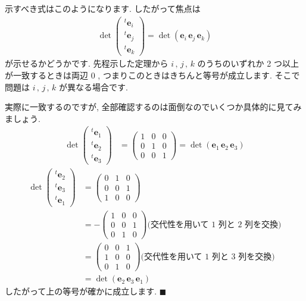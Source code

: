\documentclass[openany, a4paper, oneside]{book}
\theoremstyle{break}
\theoremstyle{breakdefn}
\begin{document}
示すべき式はこのようになります. したがって焦点は
    \begin{align}
        \det \begin{pmatrix} ^{t}\bm{e}_{i} \\ ^{t}\bm{e}_{j} \\ ^{t}\bm{e}_{k} \end{pmatrix}
        =
        \det \left ( \bm{e}_{i} \, \bm{e}_{j} \, \bm{e}_{k} \right)
    \end{align}
が示せるかどうかです. 先程示した定理から $i\, , \,j \, , \, k$ のうちのいずれか 2 つ以上が一致するときは両辺 $0$ ,
つまりこのときはきちんと等号が成立します.
そこで問題は $i\, , \,j \, , \, k$ が異なる場合です.

実際に一致するのですが, 全部確認するのは面倒なのでいくつか具体的に見てみましょう.
    \begin{align}
        \det \begin{pmatrix} ^{t}\bm{e}_{1} \\ ^{t}\bm{e}_{2} \\ ^{t}\bm{e}_{3} \end{pmatrix}
        &= \begin{pmatrix} 1 & 0 & 0 \\
                          0 & 1 & 0 \\
                          0 & 0 & 1
          \end{pmatrix}
        =
        \det \left ( \bm{e}_{1} \, \bm{e}_{2} \, \bm{e}_{3} \right)
    \end{align}
    \begin{align}
        \det \begin{pmatrix} ^{t}\bm{e}_{2} \\ ^{t}\bm{e}_{3} \\ ^{t}\bm{e}_{1} \end{pmatrix}
        &= \begin{pmatrix} 0 & 1 & 0 \\
                          0 & 0 & 1 \\
                          1 & 0 & 0
          \end{pmatrix} \\
        &= - \begin{pmatrix} 1 & 0 & 0 \\
                            0 & 0 & 1 \\
                            0 & 1 & 0
          \end{pmatrix} \text{(交代性を用いて 1 列と 2 列を交換)} \\
        &= \begin{pmatrix} 0 & 0 & 1 \\
                          1 & 0 & 0 \\
                          0 & 1 & 0
          \end{pmatrix} \text{(交代性を用いて 1 列と 3 列を交換)} \\
        &=
        \det \left ( \bm{e}_{2} \, \bm{e}_{3} \, \bm{e}_{1} \right)
    \end{align}
したがって上の等号が確かに成立します.  $\blacksquare$
\end{document}
